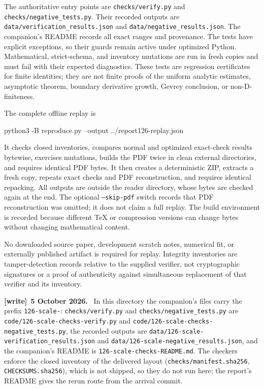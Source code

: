 \documentclass[11pt,letterpaper]{article}
\theoremstyle{remark}\newtheorem{remark}[theorem]{Remark}
\numberwithin{equation}{section}
\newcommand{\file}[1]{\nolinkurl{#1}}
\newenvironment{writenote}[1][]{\par\smallskip\begingroup\small
 \noindent\textbf{[write]}\if\relax\detokenize{#1}\relax\else~\textbf{#1.}\fi\ }%
 {\par\endgroup\smallskip}
\begin{document}
The authoritative entry points are \texttt{checks/verify.py} and
\texttt{checks/negative\_tests.py}. Their recorded outputs are
\texttt{data/verification\_results.json} and
\texttt{data/negative\_results.json}. The companion's README records
all exact ranges and provenance. The tests have explicit exceptions,
so their guards remain active under optimized Python. Mathematical,
strict-schema, and inventory mutations are run in fresh copies and
must fail with their expected diagnostics. These tests are regression
certificates for finite identities; they are not finite proofs of the
uniform analytic estimates, asymptotic theorem, boundary derivative
growth, Gevrey conclusion, or non-D-finiteness.

The complete offline replay is
\begin{center}\ttfamily
python3 -B reproduce.py --output ../report126-replay.json
\end{center}
It checks closed inventories, compares normal and optimized exact-check
results bytewise, exercises mutations, builds the PDF twice in clean
external directories, and requires identical PDF bytes. It then creates
a deterministic ZIP, extracts a fresh copy, repeats exact checks and
PDF reconstruction, and requires identical repacking. All outputs are
outside the reader directory, whose bytes are checked again at the end.
The optional \texttt{--skip-pdf} switch records that PDF reconstruction
was omitted; it does not claim a full replay. The build environment is
recorded because different TeX or compression versions can change bytes
without changing mathematical content.

No downloaded source paper, development scratch notes, numerical fit,
or externally published artifact is required for replay. Integrity
inventories are tamper-detection records relative to the supplied
verifier, not cryptographic signatures or a proof of authenticity against
simultaneous replacement of that verifier and its inventory.
\begin{writenote}[5 October 2026]
In this directory the companion's files carry the prefix \file{126-scale-}: \file{checks/verify.py} and \file{checks/negative_tests.py} are \file{code/126-scale-checks-verify.py} and \file{code/126-scale-checks-negative_tests.py}, the recorded outputs are \file{data/126-scale-verification_results.json} and \file{data/126-scale-negative_results.json}, and the companion's README is \file{126-scale-checks-README.md}. The checkers enforce the closed inventory of the delivered layout (\file{checks/manifest.sha256}, \file{CHECKSUMS.sha256}), which is not shipped, so they do not run here; the report's README gives the rerun route from the arrival commit.
\end{writenote}
\end{document}
